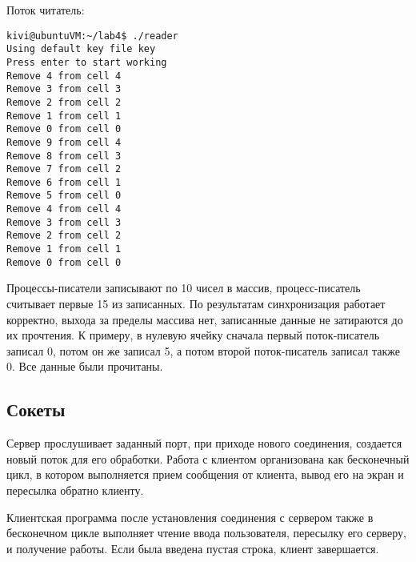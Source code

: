 \documentclass[a4paper]{article}
\begin{document}
	Поток читатель:
	\begin{lstlisting}[style=crs_bash]
kivi@ubuntuVM:~/lab4$ ./reader 
Using default key file key
Press enter to start working
Remove 4 from cell 4
Remove 3 from cell 3
Remove 2 from cell 2
Remove 1 from cell 1
Remove 0 from cell 0
Remove 9 from cell 4
Remove 8 from cell 3
Remove 7 from cell 2
Remove 6 from cell 1
Remove 5 from cell 0
Remove 4 from cell 4
Remove 3 from cell 3
Remove 2 from cell 2
Remove 1 from cell 1
Remove 0 from cell 0
	\end{lstlisting}
	
	Процессы-писатели записывают по 10 чисел в массив, процесс-писатель считывает первые 15 из записанных. По результатам синхронизация работает корректно, выхода за пределы массива нет, записанные данные не затираются до их прочтения. К примеру, в нулевую ячейку сначала первый поток-писатель записал 0, потом он же записал 5, а потом второй поток-писатель записал также 0. Все данные были прочитаны.

\subsection{Сокеты}
	Сервер прослушивает заданный порт, при приходе нового соединения, создается новый поток для его обработки. Работа с клиентом организована как бесконечный цикл, в котором выполняется прием сообщения от клиента, вывод его на экран и пересылка обратно клиенту.
	
	Клиентская программа после установления соединения с сервером также в бесконечном цикле выполняет чтение ввода пользователя, пересылку его серверу, и получение работы. Если была введена пустая строка, клиент завершается.
	
\end{document}
